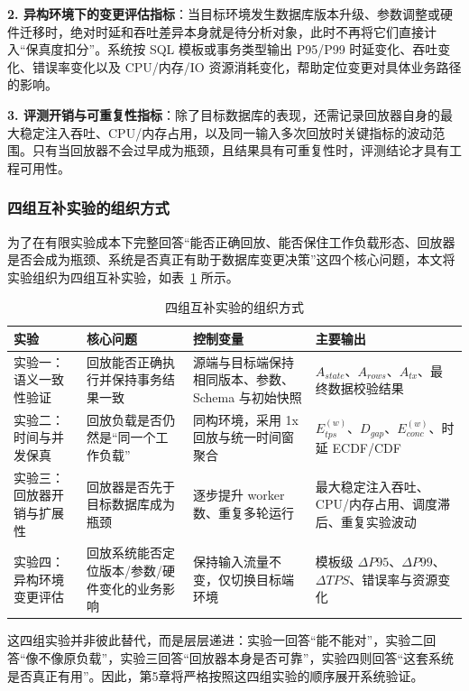\textbf{2. 异构环境下的变更评估指标}：当目标环境发生数据库版本升级、参数调整或硬件迁移时，绝对时延和吞吐差异本身就是待分析对象，此时不再将它们直接计入“保真度扣分”。系统按 SQL 模板或事务类型输出 P95/P99 时延变化、吞吐变化、错误率变化以及 CPU/内存/IO 资源消耗变化，帮助定位变更对具体业务路径的影响。

\textbf{3. 评测开销与可重复性指标}：除了目标数据库的表现，还需记录回放器自身的最大稳定注入吞吐、CPU/内存占用，以及同一输入多次回放时关键指标的波动范围。只有当回放器不会过早成为瓶颈，且结果具有可重复性时，评测结论才具有工程可用性。

\subsubsection{四组互补实验的组织方式}
为了在有限实验成本下完整回答“能否正确回放、能否保住工作负载形态、回放器是否会成为瓶颈、系统是否真正有助于数据库变更决策”这四个核心问题，本文将实验组织为四组互补实验，如表~\ref{tab:eval_four_exp} 所示。

\begin{table}[htbp]
    \centering
    \caption{四组互补实验的组织方式}
    \label{tab:eval_four_exp}
    \begin{tabular}{p{1.9cm}p{3.0cm}p{4.4cm}p{4.4cm}}
        \toprule
        \textbf{实验} & \textbf{核心问题} & \textbf{控制变量} & \textbf{主要输出} \\
        \midrule
        实验一：语义一致性验证 & 回放能否正确执行并保持事务结果一致 & 源端与目标端保持相同版本、参数、Schema 与初始快照 & $A_{state}$、$A_{rows}$、$A_{tx}$、最终数据校验结果 \\
        实验二：时间与并发保真 & 回放负载是否仍然是“同一个工作负载” & 同构环境，采用 1x 回放与统一时间窗聚合 & $E_{tps}^{(w)}$、$D_{gap}$、$E_{conc}^{(w)}$、时延 ECDF/CDF \\
        实验三：回放器开销与扩展性 & 回放器是否先于目标数据库成为瓶颈 & 逐步提升 worker 数、重复多轮运行 & 最大稳定注入吞吐、CPU/内存占用、调度滞后、重复实验波动 \\
        实验四：异构环境变更评估 & 回放系统能否定位版本/参数/硬件变化的业务影响 & 保持输入流量不变，仅切换目标端环境 & 模板级 $\Delta P95$、$\Delta P99$、$\Delta TPS$、错误率与资源变化 \\
        \bottomrule
    \end{tabular}
\end{table}

这四组实验并非彼此替代，而是层层递进：实验一回答“能不能对”，实验二回答“像不像原负载”，实验三回答“回放器本身是否可靠”，实验四则回答“这套系统是否真正有用”。因此，第5章将严格按照这四组实验的顺序展开系统验证。

